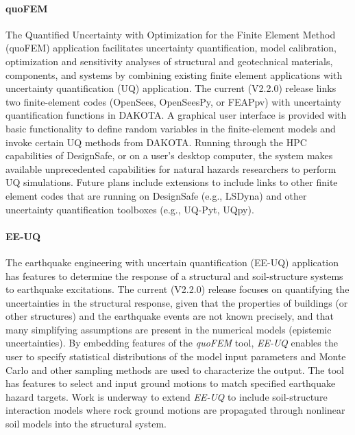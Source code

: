 \paragraph{quoFEM}  The Quantified Uncertainty with Optimization for the Finite Element Method (quoFEM) application facilitates uncertainty quantification, model calibration, optimization and sensitivity analyses of structural and geotechnical materials, components, and systems by combining existing finite element applications with uncertainty quantification (UQ) application. The current (V2.2.0) release links two finite-element codes (OpenSees, OpenSeesPy, or FEAPpv) with uncertainty quantification functions in DAKOTA. A graphical user interface is provided with basic functionality to define random variables in the finite-element models and invoke certain UQ methods from DAKOTA. Running through the HPC capabilities of DesignSafe, or on a user’s desktop computer, the system makes available unprecedented capabilities for natural hazards researchers to perform UQ simulations. Future plans include extensions to include links to other finite element codes that are running on DesignSafe (e.g., LSDyna) and other uncertainty quantification toolboxes (e.g., UQ-Pyt, UQpy).

\paragraph{EE-UQ} The earthquake engineering with uncertain quantification (EE-UQ) application has features to determine the response of a structural and soil-structure systems to earthquake excitations. The current (V2.2.0) release focuses on quantifying the uncertainties in the structural response, given that the properties of buildings (or other structures) and the earthquake events are not known precisely, and that many simplifying assumptions are present in the numerical models (epistemic uncertainties).  By embedding features of the \emph{quoFEM} tool, \emph{EE-UQ} enables the user to specify statistical distributions of the model input parameters and Monte Carlo and other sampling methods are used to characterize the output. The tool has features to select and input ground motions to match specified earthquake hazard targets. Work is underway to extend \emph{EE-UQ} to include soil-structure interaction models where rock ground motions are propagated through nonlinear soil models into the structural system.

